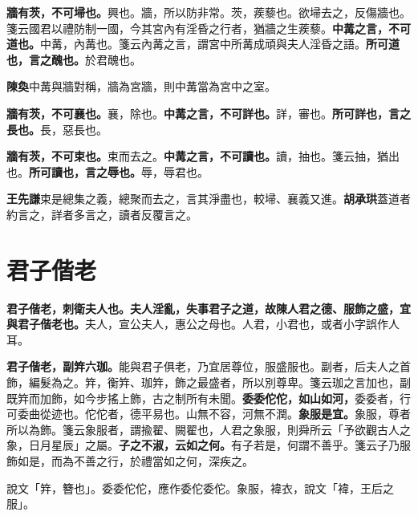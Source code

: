 \textbf{牆有茨，不可埽也。}{\footnotesize 興也。牆，所以防非常。茨，蒺藜也。欲埽去之，反傷牆也。箋云國君以禮防制一國，今其宮內有淫昏之行者，猶牆之生蒺藜。}\textbf{中冓之言，不可道也。}{\footnotesize 中冓，內冓也。箋云內冓之言，謂宮中所冓成頑與夫人淫昏之語。}\textbf{所可道也，言之醜也。}{\footnotesize 於君醜也。}

\begin{quoting}\textbf{陳奐}中冓與牆對稱，牆為宮牆，則中冓當為宮中之室。\end{quoting}

\textbf{牆有茨，不可襄也。}{\footnotesize 襄，除也。}\textbf{中冓之言，不可詳也。}{\footnotesize 詳，審也。}\textbf{所可詳也，言之長也。}{\footnotesize 長，惡長也。}

\textbf{牆有茨，不可束也。}{\footnotesize 束而去之。}\textbf{中冓之言，不可讀也。}{\footnotesize 讀，抽也。箋云抽，猶出也。}\textbf{所可讀也，言之辱也。}{\footnotesize 辱，辱君也。}

\begin{quoting}\textbf{王先謙}束是總集之義，總聚而去之，言其淨盡也，較埽、襄義又進。\textbf{胡承珙}蓋道者約言之，詳者多言之，讀者反覆言之。\end{quoting}

\section{君子偕老}


\textbf{君子偕老，刺衛夫人也。夫人淫亂，失事君子之道，故陳人君之德、服飾之盛，宜與君子偕老也。}{\footnotesize 夫人，宣公夫人，惠公之母也。人君，小君也，或者小字誤作人耳。}

\textbf{君子偕老，副筓六珈。}{\footnotesize 能與君子俱老，乃宜居尊位，服盛服也。副者，后夫人之首飾，編髮為之。筓，衡筓、珈筓，飾之最盛者，所以別尊卑。箋云珈之言加也，副既筓而加飾，如今步搖上飾，古之制所有未聞。}\textbf{委委佗佗，如山如河，}{\footnotesize 委委者，行可委曲從迹也。佗佗者，德平易也。山無不容，河無不潤。}\textbf{象服是宜。}{\footnotesize 象服，尊者所以為飾。箋云象服者，謂揄翟、闕翟也，人君之象服，則舜所云「予欲觀古人之象，日月星辰」之屬。}\textbf{子之不淑，云如之何。}{\footnotesize 有子若是，何謂不善乎。箋云子乃服飾如是，而為不善之行，於禮當如之何，深疾之。}

\begin{quoting}說文「筓，簪也」。委委佗佗，應作委佗委佗。象服，褘衣，說文「褘，王后之服」。\end{quoting}

